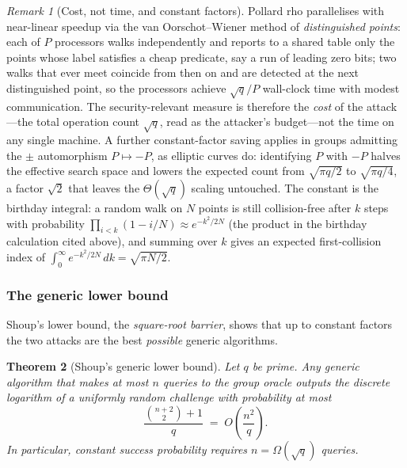 \documentclass[11pt,a4paper]{article}
\newtheorem{theorem}{Theorem}[section]
\theoremstyle{definition}
\theoremstyle{remark}
\newtheorem{remark}[theorem]{Remark}
\begin{document}
\begin{remark}[Cost, not time, and constant factors]
\label{assumptions:rem:rho-parallel}
Pollard rho parallelises with near-linear speedup via the van
Oorschot--Wiener method of \emph{distinguished points}: each of
\(P\) processors walks independently and reports to a shared table
only the points whose label satisfies a cheap predicate, say a run of
leading zero bits; two walks that ever meet coincide from then on and
are detected at the next distinguished point, so the processors
achieve \(\sqrt q / P\) wall-clock time with modest communication.
The security-relevant
measure is therefore the \emph{cost} of the attack---the total
operation count \(\sqrt q\), read as the attacker's budget---not the
time on any single machine. A further constant-factor saving applies
in groups admitting the \(\pm\) automorphism \(P \mapsto -P\), as
elliptic curves do: identifying \(P\) with \(-P\) halves the
effective search space and lowers the expected count from
\(\sqrt{\pi q / 2}\) to \(\sqrt{\pi q / 4}\), a factor \(\sqrt 2\)
that leaves the \(\Theta(\sqrt q)\) scaling untouched. The constant
is the birthday integral: a random walk on \(N\) points is still
collision-free after \(k\) steps with probability
\(\prod_{i < k}(1 - i/N) \approx e^{-k^{2}/2N}\) (the product in the
birthday calculation cited above), and summing over \(k\) gives an
expected first-collision index of
\(\int_{0}^{\infty} e^{-k^{2}/2N}\,dk = \sqrt{\pi N / 2}\).
\end{remark}

\subsubsection*{The generic lower bound}

Shoup's lower bound, the \emph{square-root barrier}, shows that up to
constant factors the two attacks are the best \emph{possible} generic
algorithms.

\begin{theorem}[Shoup's generic lower bound]
\label{assumptions:thm:shoup}
Let \(q\) be prime. Any generic algorithm that makes at most \(n\)
queries to the group oracle outputs the discrete logarithm of a
uniformly random challenge with probability at most
\[
\frac{\binom{n+2}{2} + 1}{q} \;=\; O\!\left(\frac{n^{2}}{q}\right).
\]
In particular, constant success probability requires
\(n = \Omega(\sqrt q)\) queries.
\end{theorem}
\end{document}

